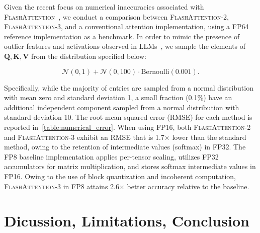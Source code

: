 \begin{itemize}
Given the recent focus on numerical inaccuracies associated with \textsc{FlashAttention}~\citep{golden2024flash}, we conduct a comparison between \textsc{FlashAttention-2}, \textsc{FlashAttention-3}, and a conventional attention implementation, using a FP64 reference implementation as a benchmark. In order to mimic the presence of outlier features and activations observed in LLMs~\citep{dettmers2208llm, sun2024massive}, we sample the elements of $\mathbf{Q}, \mathbf{K}, \mathbf{V}$ from the distribution specified below:

\begin{equation*}
  \mathcal{N}(0, 1) + \mathcal{N}(0, 100) \cdot \mathrm{Bernoulli}(0.001).
\end{equation*}

Specifically, while the majority of entries are sampled from a normal distribution with mean zero and standard deviation 1, a small fraction (0.1\%) have an additional independent component sampled from a normal distribution with standard deviation 10. The root mean squared error (RMSE) for each method is reported in~\cref{table:numerical_error}. When using FP16, both \textsc{FlashAttention-2} and \textsc{FlashAttention-3} exhibit an RMSE that is 1.7$\times$ lower than the standard method, owing to the retention of intermediate values (softmax) in FP32. The FP8 baseline implementation applies per-tensor scaling, utilizes FP32 accumulators for matrix multiplication, and stores softmax intermediate values in FP16. Owing to the use of block quantization and incoherent computation, \textsc{FlashAttention-3} in FP8 attains 2.6$\times$ better accuracy relative to the baseline.

\section{Dicussion, Limitations, Conclusion}
\label{sec:discussion}


\end{itemize}
